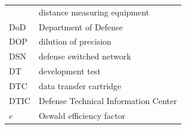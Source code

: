 \documentclass[
]{book}
\begin{document}
\begin{longtable}[]{@{}ll@{}}
\begin{minipage}[t]{0.47\columnwidth}
\end{minipage} & \begin{minipage}[t]{0.47\columnwidth}\raggedright
distance measuring equipment\strut
\end{minipage}\tabularnewline
\begin{minipage}[t]{0.47\columnwidth}\raggedright
DoD\strut
\end{minipage} & \begin{minipage}[t]{0.47\columnwidth}\raggedright
Department of Defense\strut
\end{minipage}\tabularnewline
\begin{minipage}[t]{0.47\columnwidth}\raggedright
DOP\strut
\end{minipage} & \begin{minipage}[t]{0.47\columnwidth}\raggedright
dilution of precision\strut
\end{minipage}\tabularnewline
\begin{minipage}[t]{0.47\columnwidth}\raggedright
DSN\strut
\end{minipage} & \begin{minipage}[t]{0.47\columnwidth}\raggedright
defense switched network\strut
\end{minipage}\tabularnewline
\begin{minipage}[t]{0.47\columnwidth}\raggedright
DT\strut
\end{minipage} & \begin{minipage}[t]{0.47\columnwidth}\raggedright
development test\strut
\end{minipage}\tabularnewline
\begin{minipage}[t]{0.47\columnwidth}\raggedright
DTC\strut
\end{minipage} & \begin{minipage}[t]{0.47\columnwidth}\raggedright
data transfer cartridge\strut
\end{minipage}\tabularnewline
\begin{minipage}[t]{0.47\columnwidth}\raggedright
DTIC\strut
\end{minipage} & \begin{minipage}[t]{0.47\columnwidth}\raggedright
Defense Technical Information Center\strut
\end{minipage}\tabularnewline
\begin{minipage}[t]{0.47\columnwidth}\raggedright
\(e\)\strut
\end{minipage} & \begin{minipage}[t]{0.47\columnwidth}\raggedright
Oswald efficiency factor\strut

\end{minipage}
\end{longtable}
\end{document}

